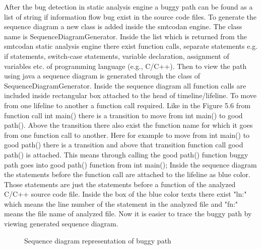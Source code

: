 After the bug detection in static analysis engine a buggy path can be found as a list of string if information flow bug exist in the source code files. To generate the sequence diagram a new class is added inside the smtcodan engine. The class name is SequenceDiagramGenerator. Inside the list which is returned from the smtcodan static analysis engine there
exist function calls, separate statements e.g. if statements, switch-case statements, variable declaration, assignment of variables etc. of programming language (e.g., C/C++). Then to view the path using java a sequence diagram is generated through the class of SequenceDiagramGenerator. Inside the sequence diagram all function calls are included inside rectangular box attached to the head of timeline/lifeline. To move from one lifeline to another a function call
required. Like in the Figure 5.6 from function call int main() there is a transition to move from int
main() to good path(). Above the transition there also exist the function name for which it goes from one function call to another. Here for example to move from int main() to good path() there is a transition and above that transition function call good path() is attached. This means through calling the good path() function buggy path goes into good path() function from int main(); Inside
the sequence diagram the statements before the function call are attached to the lifeline as blue color. Those statements are just the statements before a function of the analyzed C/C++ source code file. Inside the box of the blue color texts there exist "ln:" which means the line number of the statement in the analyzed file and "fn:" means the file name of analyzed file. Now it is easier to trace the buggy path by viewing generated sequence diagram.

\begin{figure}[htbp]
	\centering
	\label{fig:viewSequenceDiagram}
	\caption{Sequence diagram representation of buggy path}
\end{figure}
